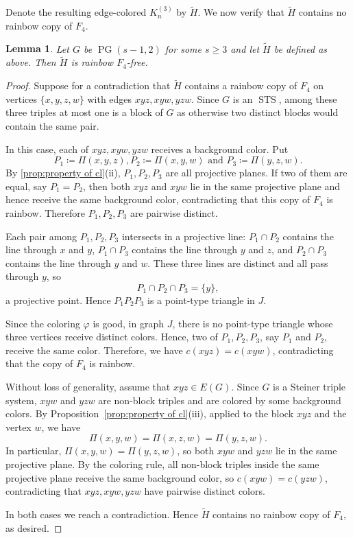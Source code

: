 \documentclass[10pt,a4paper]{article}
\newtheorem{lemma}[theorem]{Lemma}
\theoremstyle{definition}
\newcommand{\wt}{\widetilde}
\DeclareMathOperator{\STS}{STS}
\DeclareMathOperator{\PG}{PG}
\begin{document}
Denote the resulting edge-colored $K_n^{(3)}$ by $\wt{H}$.
We now verify that $\wt{H}$ contains no rainbow copy of $F_4$.
\begin{lemma}\label{lem:auxiliary}
    Let $G$ be $\PG(s-1,2)$ for some $s\ge3$ and let $\wt{H}$ be defined as above.
    Then $\wt{H}$ is rainbow $F_4$-free.
\end{lemma}
\begin{proof}
    Suppose for a contradiction that $\wt{H}$ contains a rainbow copy of $F_4$ on vertices $\{x,y,z,w\}$ with edges $xyz,xyw,yzw$.
    Since $G$ is an $\STS$, among these three triples at most one is a block of $G$ as otherwise two distinct blocks would contain the same pair.

    \medskip

    In this case, each of $xyz,xyw,yzw$ receives a background color.
    Put
    \[
        P_1\coloneqq \Pi(x,y,z),
        P_2\coloneqq \Pi(x,y,w)\text{ and }
        P_3\coloneqq \Pi(y,z,w).
    \]
    By \cref{prop:property of cl}(ii), $P_1,P_2,P_3$ are all projective planes.
    If two of them are equal, say $P_1=P_2$, then both $xyz$ and $xyw$ lie in the same projective plane and hence receive the same background color, contradicting that this copy of $F_4$ is rainbow.
    Therefore $P_1,P_2,P_3$ are pairwise distinct.

    Each pair among $P_1,P_2,P_3$ intersects in a projective line:
    $P_1\cap P_2$ contains the line through $x$ and $y$, $P_1\cap P_3$ contains the line through $y$ and $z$, and $P_2\cap P_3$ contains the line through $y$ and $w$.
    These three lines are distinct and all pass through $y$, so
    \[
        P_1\cap P_2\cap P_3=\{y\},
    \]
    a projective point.
    Hence $P_1P_2P_3$ is a point-type triangle in $J$.

    Since the coloring $\varphi$ is good, in graph $J$, there is no point-type triangle whose three vertices receive distinct colors.
    Hence, two of $P_1,P_2,P_3$, say $P_1$ and $P_2$, receive the same color.
    Therefore, we have $c(xyz)=c(xyw)$, contradicting that the copy of $F_4$ is rainbow.

    \medskip

    Without loss of generality, assume that $xyz\in E(G)$.
    Since $G$ is a Steiner triple system, $xyw$ and $yzw$ are non-block triples and are colored by some background colors.
    By Proposition~\ref{prop:property of cl}(iii), applied to the block $xyz$ and the vertex $w$, we have
    \[
        \Pi(x,y,w)=\Pi(x,z,w)=\Pi(y,z,w).
    \]
    In particular, $\Pi(x,y,w)=\Pi(y,z,w)$, so both $xyw$ and $yzw$ lie in the same projective plane.
    By the coloring rule, all non-block triples inside the same projective plane receive the same background color, so $c(xyw)=c(yzw)$, contradicting that $xyz,xyw,yzw$ have pairwise distinct colors.

    \medskip
    In both cases we reach a contradiction. Hence $\wt H$ contains no rainbow copy of $F_4$, as desired.
\end{proof}
\end{document}
